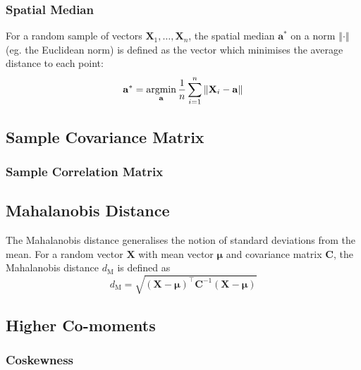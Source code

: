 \documentclass[11pt]{report} %
\begin{document}
\subsubsection{Spatial Median}

For a random sample of vectors $\mathbf{X}_{1}, \dots, \mathbf{X}_{n}$, the spatial median $\mathbf{a}^{*}$ on a norm $\left\Vert\cdot\right\Vert$ (eg. the Euclidean norm) is defined as the vector which minimises the average distance to each point:
\begin{equation}
\mathbf{a}^{*} = \operatorname*{argmin}_{\mathbf{a}} \dfrac{1}{n}\sum_{i = 1}^{n}\left\Vert \mathbf{X}_{i} - \mathbf{a}\right\Vert
\end{equation}

\subsection{Sample Covariance Matrix}

\subsubsection{Sample Correlation Matrix}

\subsection{Mahalanobis Distance}

The Mahalanobis distance generalises the notion of standard deviations from the mean. For a random vector $\mathbf{X}$ with mean vector $\boldsymbol{\mu}$ and covariance matrix $\mathbf{C}$, the Mahalanobis distance $d_{\mathrm{M}}$ is defined as
\begin{equation}
d_{\mathrm{M}} = \sqrt{\left(\mathbf{X} - \boldsymbol{\mu}\right)^{\top}\mathbf{C}^{-1}\left(\mathbf{X} - \boldsymbol{\mu}\right)}
\end{equation}

\subsection{Higher Co-moments \cite{Miller2013}}

\subsubsection{Coskewness}
\end{document}
